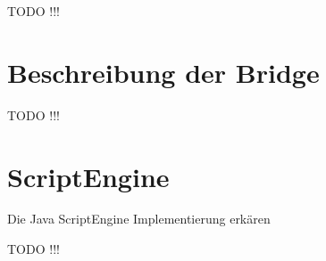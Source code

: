 TODO !!!


\section{Beschreibung der Bridge}

TODO !!!



\section{ScriptEngine}

Die Java ScriptEngine Implementierung erkären

TODO !!!